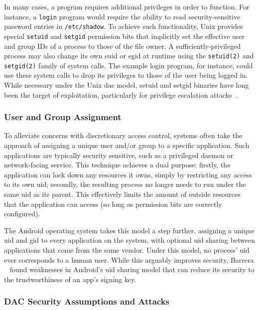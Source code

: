 \documentclass[
  fontsize=12pt,
  titlepage=firstiscover,
  paper=letter,
oneside,
  cleardoublepage=plain,
  parskip=half-,
  DIV=10,
  parindent,
  appendixprefix,
  chapterprefix,
  listof=totoc,
]{scrbook}
\begin{document}
In many cases, a program requires additional privileges in order to function. For
instance, a \texttt{login} program would require the ability to read security-sensitive
password entries in \texttt{/etc/shadow}. To achieve such functionality, Unix provides
special \texttt{setuid} and \texttt{setgid} permission bits that implicitly set the
effective user and group IDs of a process to those of the file owner.
A sufficiently-privileged process may also change its own \gls{euid} or \gls{egid} at
runtime using the \texttt{setuid(2)} and \texttt{setgid(2)} family of system calls. The
example login program, for instance, could use these system calls to drop its privileges
to those of the user being logged in. While necessary under the Unix \gls{dac} model,
setuid and setgid binaries have long been the target of exploitation, particularly for
privilege escalation attacks~\cite{dittmer2014_setuid, van_oorschot2020_tools_jewels,
jaeger2008_os_security}.

\subsubsection*{User and Group Assignment}

To alleviate concerns with discretionary access control, systems often take the approach
of assigning a unique user and/or group to a specific application. Such applications are
typically security sensitive, such as a privileged daemon or network-facing service. This
technique achieves a dual purpose: firstly, the application can lock down any resources it
owns, simply by restricting any access to its own \gls{uid}; secondly, the resulting
process no longer needs to run under the same \gls{uid} as its parent. This effectively
limits the amount of outside resources that the application can access (so long as
permission bits are correctly configured).

The Android operating system takes this model a step further, assigning a unique \gls{uid}
and \gls{gid} to every application on the system, with optional \gls{uid} sharing between
applications that come from the same vendor. Under this model, no process' \gls{uid} ever
corresponds to a human user. While this arguably improves security, Barrera
\etal~\cite{barrera2012_android} found weaknesses in Android's \gls{uid} sharing model
that can reduce its security to the trustworthiness of an app's signing key.

\subsubsection*{DAC Security Assumptions and Attacks}
\end{document}
